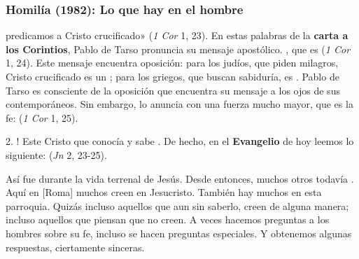 \newpage
\subsubsection{Homilía (1982): Lo que hay en el hombre}


\begin{body}
 predicamos a Cristo crucificado» (\textit{1 Cor} 1, 23). En estas palabras de la \textbf{carta a los Corintios}, Pablo de Tarso pronuncia su mensaje apostólico. , que es  (\textit{1 Cor} 1, 24). Este mensaje encuentra oposición: para los judíos, que piden milagros, Cristo crucificado es un ; para los griegos, que buscan sabiduría, es . Pablo de Tarso es consciente de la oposición que encuentra su mensaje a los ojos de sus contemporáneos. Sin embargo, lo anuncia con una fuerza mucho mayor, que es la fe:  (\textit{1 Cor} 1, 25).


2. ! Este Cristo que conocía y sabe . De hecho, en el \textbf{Evangelio} de hoy leemos lo siguiente:  (\textit{Jn} 2, 23-25).

Así fue durante la vida terrenal de Jesús. Desde entonces, muchos otros todavía . Aquí en [Roma] muchos creen en Jesucristo. También hay muchos en esta parroquia. Quizás incluso aquellos que aun sin saberlo, creen de alguna manera; incluso aquellos que piensan que no creen. A veces hacemos preguntas a los hombres sobre su fe, incluso se hacen preguntas especiales. Y obtenemos algunas respuestas, ciertamente sinceras.


\end{body}
